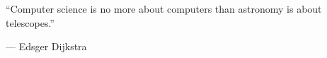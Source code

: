 
``Computer science is no more about computers than astronomy is about telescopes.'' \\
\begin{footnotesize}
--- Edsger Dijkstra
\end{footnotesize}
